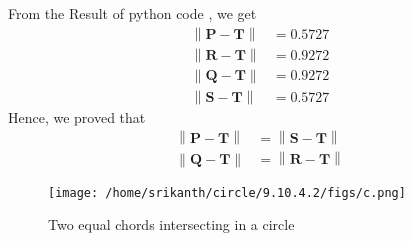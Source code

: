 \documentclass[12pt]{article}
\providecommand{\norm}[1]{\left\lVert#1\right\rVert}
\let\vec\mathbf
\begin{document}
From the Result of python code , we get
\begin{align}
\norm{\vec{P}-\vec{T}}&=0.5727\\
\norm{\vec{R}-\vec{T}}&=0.9272\\
\norm{\vec{Q}-\vec{T}}&=0.9272\\
\norm{\vec{S}-\vec{T}}&=0.5727
\end{align}
Hence, we proved that
\begin{align}
\norm{\vec{P}-\vec{T}}&=\norm{\vec{S}-\vec{T}}\\
\norm{\vec{Q}-\vec{T}}&=\norm{\vec{R}-\vec{T}}
\end{align} 
\begin{figure}[!h]
	\begin{center} 
	  \texttt{[image: /home/srikanth/circle/9.10.4.2/figs/c.png]}
	\end{center}
\caption{Two equal chords intersecting in a circle}
\label{fig:Fig1}
\end{figure}
\end{document}
